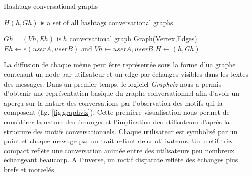 \begin{algorithm}[htbp]
    \caption{Hashtags conversational graphs}
    \label{algo:hashtags-graph}
    \begin{algorithmic}
        \State $H(h,Gh)$ is a set of all hashtags conversational graphs


                    \State $Gh=(Vh,Eh)$ is $h$ conversational graph Graph(Vertex,Edges)
                        \State $Eh \gets e(userA,userB)$ and $Vh \gets userA,userB $
                    \EndIf
                    \State $H \gets (h,Gh)$ 
                \EndIf
            \EndFor
        \EndFunction
    \end{algorithmic}
\end{algorithm}

La diffusion de chaque mème peut être représentée sous la forme d{\textquoteright}un graphe contenant un node par utilisateur et un edge par échanges visibles dans les textes des messages. Dans un premier temps, le logiciel \textit{Graphviz} nous a permis d{\textquoteright}obtenir une représentation basique du graphe conversationnel afin d{\textquoteright}avoir un aper\c{c}u sur la nature des conversations par l{\textquoteright}observation des motifs qui la composent (fig. \ref{fig:graphviz}). Cette première visualisation nous permet de considérer la nature des échanges et l{\textquoteright}implication des utilisateurs d{\textquoteright}après la structure des motifs conversationnels. Chaque utilisateur est symbolisé par un point et chaque message par un trait reliant deux utilisateurs. Un motif très compact reflète une conversation animée entre des utilisateurs peu nombreux échangeant beaucoup. A l{\textquoteright}inverse, un motif disparate reflète des échanges plus brefs et morcelés.

